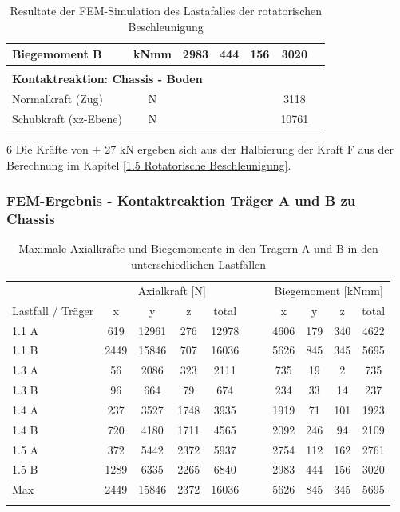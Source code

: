 \begin{table}[H]
\begin{threeparttable}
\begin{tabular}{lcccccc}
  Biegemoment B	&	kNmm	&	2983	&	444	&	156	&	3020	&		\\	\hline	\\
  \multicolumn{5}{l}{\textbf{Kontaktreaktion: Chassis - Boden}}									&		&		\\	\thickhline
  Normalkraft (Zug)	&	N	&		&		&		&	3118	&		\\
  Schubkraft (xz-Ebene)	&	N	&		&		&		&	10761	&		\\	\hline
  \end{tabular}
  \begin{tablenotes}
      \item[6]Die Kräfte von  $\pm$ 27 kN ergeben sich aus der Halbierung der Kraft F aus der Berechnung im Kapitel \ref{1.5 Rotatorische Beschleunigung}.
  \end{tablenotes}
\end{threeparttable}
  \caption{Resultate der FEM-Simulation des Lastafalles der rotatorischen Beschleunigung}
  \label{tab:FEM 1.5}
  \end{table}



  \subsubsection{FEM-Ergebnis - Kontaktreaktion Träger A und B zu Chassis}
  \label{sec:FEMres Träger}
  \begin{table}[H]
  \centering
  \begin{tabular}{lcccccccccc}
  \thickhline
  	&	\multicolumn{4}{c}{Axialkraft [N]}							&	&	&	\multicolumn{4}{c}{Biegemoment [kNmm]}							\\
  Lastfall / Träger	&	x	&	y	&	z	&	total	&	&	&	x	&	y	&	z	&	total	\\	\hline
  1.1 A	&	619	&	12961	&	276	&	12978	&	&	&	4606	&	179	&	340	&	4622	\\
  1.1 B	&	2449	&	15846	&	707	&	16036	&	&	&	5626	&	845	&	345	&	5695	\\
  1.3 A	&	56	&	2086	&	323	&	2111	&	&	&	735	&	19	&	2	&	735	\\
  1.3 B	&	96	&	664	&	79	&	674	&	&	&	234	&	33	&	14	&	237	\\
  1.4 A	&	237	&	3527	&	1748	&	3935	&	&	&	1919	&	71	&	101	&	1923	\\
  1.4 B	&	720	&	4180	&	1711	&	4565	&	&	&	2092	&	246	&	94	&	2109	\\
  1.5 A	&	372	&	5442	&	2372	&	5937	&	&	&	2754	&	112	&	162	&	2761	\\
  1.5 B	&	1289	&	6335	&	2265	&	6840	&	&	&	2983	&	444	&	156	&	3020	\\	\hline
  Max	&	2449	&	15846	&	2372	&	16036	&	&	&	5626	&	845	&	345	&	5695	\\	\thickhline
  \end{tabular}
  \caption{Maximale Axialkräfte und Biegemomente in den Trägern A und B in den unterschiedlichen Lastfällen}
  \label{tab:FEMres Träger Kont}
  \end{table}


